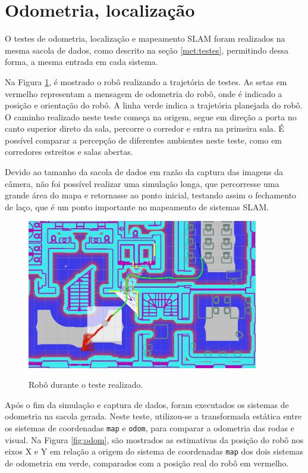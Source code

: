 \documentclass[repeatfields,xlists,xpacks,oneside,yearsonly]{ufrgscca}
\begin{document}
\section{Odometria, localização}

O testes de odometria, localização e mapeamento SLAM foram realizados
na mesma sacola de dados, como descrito na seção \ref{met:testes},
permitindo dessa forma, a mesma entrada em cada sistema.

Na Figura \ref{fig:base_bag}, é mostrado o robô realizando a
trajetória de testes. As setas em vermelho representam a mensagem de
odometria do robô, onde é indicado a posição e orientação do robô. A
linha verde indica a trajetória planejada do robô. O caminho
realizado neste teste começa na origem, segue em direção a porta no
canto superior direto da sala, percorre o corredor e entra na
primeira sala. É possível comparar a percepção de diferentes
ambientes neste teste, como em corredores estreitos e salas abertas.

Devido ao tamanho da sacola de dados em razão da captura das imagens
da câmera, não foi possível realizar uma simulação longa, que
percorresse uma grande área do mapa e retornasse ao ponto inicial,
testando assim o fechamento de laço, que é um ponto importante no
mapeamento de sistemas SLAM.

\begin{figure}[h]
    {
        \centering
        \caption{Robô durante o teste realizado.}
        \label{fig:base_bag}
        \includegraphics[width=0.9\textwidth]{base_bag_sim_zoom.png}\\
    }
\end{figure}

Após o fim da simulação e captura de dados, foram executados os
sistemas de odometria na sacola gerada. Neste teste, utilizou-se a
transformada estática entre os sistemas de coordenadas \texttt{map} e
\texttt{odom}, para comparar a odometria das rodas e visual. Na
Figura \ref{fig:odom}, são mostrados as estimativas da posição do
robô nos eixos X e Y em relação a origem do sistema de coordenadas
\texttt{map} dos dois sistemas de odometria em verde, comparados com
a posição real do robô em vermelho.
\end{document}
